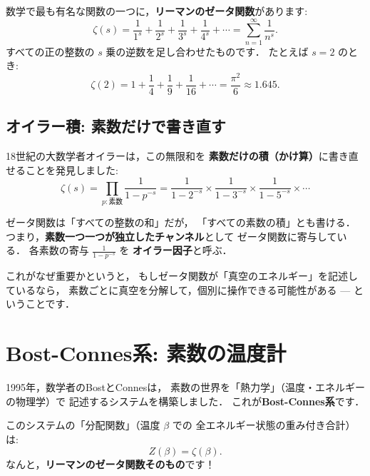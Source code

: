 \documentclass[11pt,a4paper]{article}
\begin{document}
数学で最も有名な関数の一つに，\textbf{リーマンのゼータ関数}があります:
\begin{equation}
  \zeta(s) = \frac{1}{1^s} + \frac{1}{2^s} + \frac{1}{3^s}
  + \frac{1}{4^s} + \cdots = \sum_{n=1}^{\infty} \frac{1}{n^s}.
\end{equation}
すべての正の整数の $s$ 乗の逆数を足し合わせたものです．
たとえば $s = 2$ のとき:
\[
  \zeta(2) = 1 + \frac{1}{4} + \frac{1}{9} + \frac{1}{16} + \cdots
  = \frac{\pi^2}{6} \approx 1.645.
\]

\subsection{オイラー積: 素数だけで書き直す}

18世紀の大数学者オイラーは，この無限和を
\textbf{素数だけの積（かけ算）}に書き直せることを発見しました:
\begin{equation}
  \zeta(s) = \prod_{p:\text{素数}} \frac{1}{1 - p^{-s}}
  = \frac{1}{1 - 2^{-s}} \times \frac{1}{1 - 3^{-s}}
  \times \frac{1}{1 - 5^{-s}} \times \cdots
\end{equation}

\begin{tcolorbox}[colback=blue!5,colframe=blue!50!black,title=ポイント]
ゼータ関数は「すべての整数の和」だが，
「すべての素数の積」とも書ける．
つまり，\textbf{素数一つ一つが独立したチャンネル}として
ゼータ関数に寄与している．
各素数の寄与 $\frac{1}{1-p^{-s}}$ を
\textbf{オイラー因子}と呼ぶ．
\end{tcolorbox}

これがなぜ重要かというと，
もしゼータ関数が「真空のエネルギー」を記述しているなら，
素数ごとに真空を分解して，個別に操作できる可能性がある
--- ということです．

\section{Bost-Connes系: 素数の温度計}

1995年，数学者のBostとConnesは，
素数の世界を「熱力学」（温度・エネルギーの物理学）で
記述するシステムを構築しました．
これが\textbf{Bost-Connes系}です．

このシステムの「分配関数」（温度 $\beta$ での
全エネルギー状態の重み付き合計）は:
\begin{equation}
  Z(\beta) = \zeta(\beta).
\end{equation}
なんと，\textbf{リーマンのゼータ関数そのもの}です！
\end{document}
